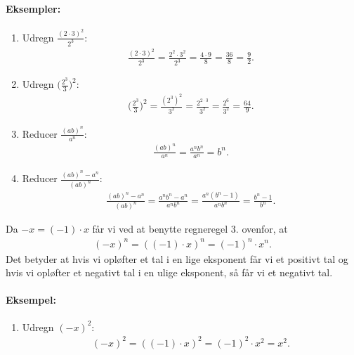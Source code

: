 \paragraph{Eksempler:}
\begin{enumerate}
\item Udregn $\frac{(2\cdot3)^2}{2^3}$:
\begin{align*}
\frac{(2\cdot 3)^2}{2^3} = \frac{2^2 \cdot 3^2}{2^3}=\frac{4\cdot 9}{8}=\frac{36}{8}=\frac{9}{2}.
\end{align*}
\item Udregn $\Big(\frac{2^3}{3}\Big)^2$:
\begin{align*}
\Big(\frac{2^3}{3}\Big)^2=\frac{(2^3)^2}{3^2}=\frac{2^{2 \cdot 3}}{3^2}=\frac{2^6}{3^2}=\frac{64}{9}.
\end{align*}
\item Reducer $\frac{(ab)^n}{a^n}$:
\begin{align*}
\frac{(ab)^n}{a^n} = \frac{a^nb^n}{a^n}=b^n.
\end{align*}
\item Reducer $\frac{(ab)^n-a^n}{(ab)^n}$:
\begin{align*}
\frac{(ab)^n-a^n}{(ab)^n} = \frac{a^nb^n-a^n}{a^nb^n}= \frac{a^n(b^n-1)}{a^nb^n}= \frac{b^n-1}{b^n}.
\end{align*}
\end{enumerate}
Da $-x=(-1) \cdot x$ får vi ved at benytte regneregel 3. ovenfor, at 
\begin{align*}
(-x)^n=((-1) \cdot x)^n=(-1)^n \cdot x^n.
\end{align*}
Det betyder at hvis vi opløfter et tal i en lige eksponent får vi et positivt tal og hvis vi opløfter et negativt tal i en ulige eksponent, så får vi et negativt tal.
\paragraph{Eksempel:}
\begin{enumerate}
\item Udregn $(-x)^2$:
\begin{align*}
(-x)^2=((-1) \cdot x)^2 = (-1)^2 \cdot x^2=x^2.
\end{align*}
\end{enumerate} 
























